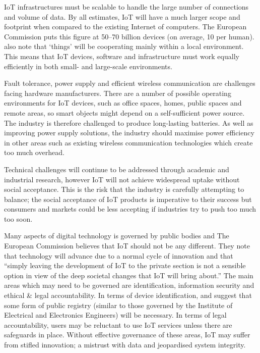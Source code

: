     IoT infrastructures must be scalable to handle the large number of connections and volume of data. By all estimates, IoT will have a much larger scope and footprint when compared to the existing Internet of computers. The European Commission puts this figure at 50--70 billion devices (on average, 10 per human). \citet{fromIoC} also note that `things' will be cooperating mainly within a local environment. This means that IoT devices, software and infrastructure must work equally efficiently in both small- and large-scale environments.

    Fault tolerance, power supply and efficient wireless communication are challenges facing hardware manufacturers. There are a number of possible operating environments for IoT devices, such as office spaces, homes, public spaces and remote areas, so smart objects might depend on a self-sufficient power source. The industry is therefore challenged to produce long-lasting batteries. As well as improving power supply solutions, the industry should maximise power efficiency in other areas such as existing wireless communication technologies which create too much overhead. 

    Technical challenges will continue to be addressed through academic and industrial research, however IoT will not achieve widespread uptake without social acceptance. This is the risk that the industry is carefully attempting to balance; the social acceptance of IoT products is imperative to their success but consumers and markets could be less accepting if industries try to push too much too soon.

    Many aspects of digital technology is governed by public bodies and The European Commission believes that IoT should not be any different. They note that technology will advance due to a normal cycle of innovation and that ``simply leaving the development of IoT to the private section is not a sensible option in view of the deep societal changes that IoT will bring about.'' The main areas which may need to be governed are identification, information security and ethical \& legal accountability. In terms of device identification, \citet{fromIoC} and \citet{ECIoT:2009} suggest that some form of public registry (similar to those governed by the Institute of Electrical and Electronics Engineers) will be necessary. In terms of legal accountability, users may be reluctant to use IoT services unless there are safeguards in place. Without effective governance of these areas, IoT may suffer from stifled innovation; a mistrust with data and jeopardised system integrity.

